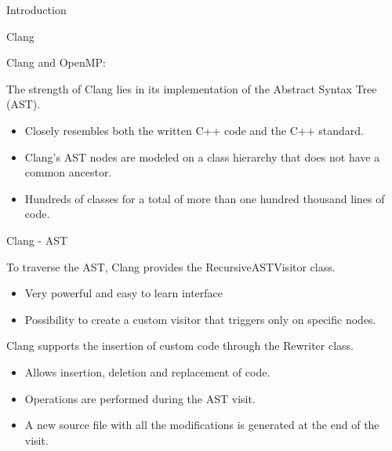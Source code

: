 \documentclass[xcolor=dvipsnames]{beamer}
\begin{document}
\begin{section}{Introduction}
\begin{frame}{\hskip 0.3cm Clang}

Clang and OpenMP:

The strength of Clang lies in its implementation of the Abstract Syntax Tree (AST).
\begin{itemize}

\item Closely resembles both the written C++ code and the C++ standard.

\item Clang’s AST nodes are modeled on a class hierarchy that does not have a common ancestor.

\item Hundreds of classes for a total of more than one hundred thousand lines of code.

\end{itemize}
\end{frame}
















\begin{frame}{\hskip 0.3cm Clang - AST}

To traverse the AST, Clang provides the RecursiveASTVisitor class.
\begin{itemize}

\item Very powerful and easy to learn interface

\item Possibility to create a custom visitor that triggers only on specific nodes.


\end{itemize}

Clang supports the insertion of custom code through the Rewriter class.
\begin{itemize}

\item Allows insertion, deletion and replacement of code.

\item Operations are performed during the AST visit.

\item A new source file with all the modifications is generated at the end of the visit.

\end{itemize}


\end{frame}
\end{section}
\end{document}
